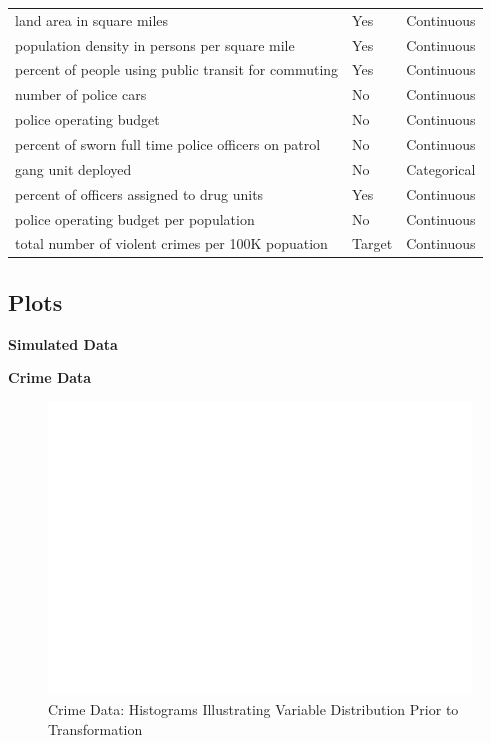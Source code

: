 \documentclass[
  11pt,
]{article}
\begin{document}
\begin{longtable}[t]{lll}
land area in square miles & Yes & Continuous\\
population density in persons per square mile & Yes & Continuous\\
\addlinespace
percent of people using public transit for commuting & Yes & Continuous\\
number of police cars & No & Continuous\\
police operating budget & No & Continuous\\
percent of sworn full time police officers on patrol & No & Continuous\\
gang unit deployed & No & Categorical\\
\addlinespace
percent of officers assigned to drug units & Yes & Continuous\\
police operating budget per population & No & Continuous\\
total number of violent crimes per 100K popuation & Target & Continuous\\*
\end{longtable}

\subsection{Plots}

\textbf{Simulated Data}

\textbf{Crime Data}

\begin{figure}[H]

{\centering \includegraphics[width=0.85\linewidth]{dissertation_files/figure-latex/Histograms FULL df Plot-1} 

}

\caption{Crime Data: Histograms Illustrating Variable Distribution Prior to Transformation}\label{fig:Histograms FULL df Plot}
\end{figure}
\end{document}
